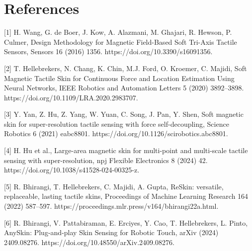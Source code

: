 \documentclass[preprint,12pt]{elsarticle}
\begin{document}
\section{References}

[1] H. Wang, G. de Boer, J. Kow, A. Alazmani, M. Ghajari, R. Hewson, P. Culmer, Design Methodology for Magnetic Field-Based Soft Tri-Axis Tactile Sensors, Sensors 16 (2016) 1356. https://doi.org/10.3390/s16091356.

[2] T. Hellebrekers, N. Chang, K. Chin, M.J. Ford, O. Kroemer, C. Majidi, Soft Magnetic Tactile Skin for Continuous Force and Location Estimation Using Neural Networks, IEEE Robotics and Automation Letters 5 (2020) 3892--3898. https://doi.org/10.1109/LRA.2020.2983707.

[3] Y. Yan, Z. Hu, Z. Yang, W. Yuan, C. Song, J. Pan, Y. Shen, Soft magnetic skin for super-resolution tactile sensing with force self-decoupling, Science Robotics 6 (2021) eabc8801. https://doi.org/10.1126/scirobotics.abc8801.

[4] H. Hu et al., Large-area magnetic skin for multi-point and multi-scale tactile sensing with super-resolution, npj Flexible Electronics 8 (2024) 42. https://doi.org/10.1038/s41528-024-00325-z.

[5] R. Bhirangi, T. Hellebrekers, C. Majidi, A. Gupta, ReSkin: versatile, replaceable, lasting tactile skins, Proceedings of Machine Learning Research 164 (2022) 587--597. https://proceedings.mlr.press/v164/bhirangi22a.html.

[6] R. Bhirangi, V. Pattabiraman, E. Erciyes, Y. Cao, T. Hellebrekers, L. Pinto, AnySkin: Plug-and-play Skin Sensing for Robotic Touch, arXiv (2024) 2409.08276. https://doi.org/10.48550/arXiv.2409.08276.
\end{document}

